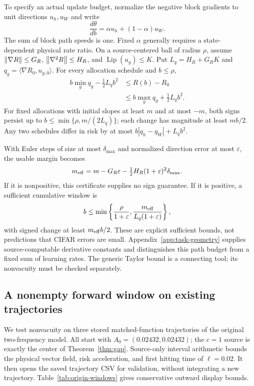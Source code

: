 To specify an actual update budget, normalize the negative block gradients to unit directions $u_h,u_W$ and write
\begin{equation}
 \frac{d\theta}{db}=\alpha u_h+(1-\alpha)u_W.
\end{equation}
The sum of block path speeds is one. Fixed $\alpha$ generally requires a state-dependent physical rate ratio. On a source-centered ball of radius $\rho$, assume $\left\lVert \nabla R\right\rVert\le G_R$, $\left\lVert \nabla^2R\right\rVert\le H_R$, and $\operatorname{Lip}(u_g)\le K$. Put $L_q=H_R+G_RK$ and $q_g=\langle\nabla R_0,u_{g,0}\rangle$. For every allocation schedule and $b\le\rho$,
\begin{align}
 b\min_g q_g-\tfrac12L_qb^2
 &\le R(b)-R_0\nonumber\\
 &\le b\max_g q_g+\tfrac12L_qb^2.
 \label{eq:budget-envelope}
\end{align}
For fixed allocations with initial slopes at least $m$ and at most $-m$, both signs persist up to $b\le\min\{\rho,m/(2L_q)\}$; each change has magnitude at least $mb/2$. Any two schedules differ in risk by at most $b|q_h-q_W|+L_qb^2$.

With Euler steps of size at most $\delta_{\max}$ and normalized direction error at most $\varepsilon$, the usable margin becomes
\begin{equation}
 m_{\rm eff}=m-G_R\varepsilon
 -\tfrac12H_R(1+\varepsilon)^2\delta_{\max}.
 \label{eq:margin-budget}
\end{equation}
If it is nonpositive, this certificate supplies no sign guarantee. If it is positive, a sufficient cumulative window is
\begin{equation}
 b\le\min\left\{\frac\rho{1+\varepsilon},
 \frac{m_{\rm eff}}{L_q(1+\varepsilon)}\right\},
\end{equation}
with signed change at least $m_{\rm eff}b/2$. These are explicit sufficient bounds, not predictions that CIFAR errors are small. Appendix~\ref{app:task-geometry} supplies source-computable derivative constants and distinguishes this path budget from a fixed sum of learning rates. The generic Taylor bound is a connecting tool; its nonvacuity must be checked separately.



\subsection{A nonempty forward window on existing trajectories}
\label{sec:origin-windows}
We test nonvacuity on three stored matched-function trajectories of the original two-frequency model. All start with $A_0=(0.02432,0.02432)$; the $c=1$ source is exactly the center of Theorem~\ref{thm:gap}. Source-only interval arithmetic bounds the physical vector field, risk acceleration, and first hitting time of $\ell=0.02$. It then opens the saved trajectory CSV for validation, without integrating a new trajectory. Table~\ref{tab:origin-windows} gives conservative outward display bounds.

